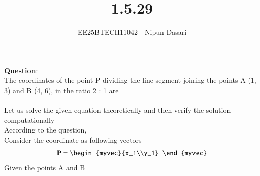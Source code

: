 \documentclass[journal]{IEEEtran}
\begin{document}
	
	
	\vspace{3cm}
	
	\title{1.5.29}
	\author{EE25BTECH11042 - Nipun Dasari}
	\maketitle
	{\let\newpage\relax\maketitle}
	
	\renewcommand{\thefigure}{\theenumi}
	\renewcommand{\thetable}{\theenumi}
	\setlength{\intextsep}{10pt} %
	
	
	\renewcommand{\thetable}{\theenumi}
	
	\textbf{Question}:\\
	The coordinates of the point P dividing the line segment joining the points A (1, 3)
	and B (4, 6), in the ratio 2 : 1 are \\ 
	\solution \\
	Let us solve the given equation theoretically and then verify the solution computationally \\
	According to the question, \\
	Consider the coordinate as following vectors \\ 
	\begin{align*}
		\vec{P} = \begin{myvec}{x_1\\y_1} \end{myvec}
	\end{align*}
	Given the points A and B
	
\end{document}
